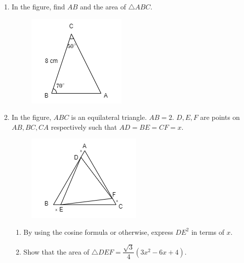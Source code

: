 \documentclass[11pt]{article}
\begin{document}
\begin{enumerate}
    \hrulefill
        
        \hrulefill
            
        \hrulefill
        
        \hrulefill
        
        \hrulefill
            
        \hrulefill
        
        \hrulefill

    \item In the figure, find $AB$ and the area of $\triangle ABC$.\begin{figure}[H]
        \centering
        \includegraphics[scale=0.8]{f4finalq39.png}
    \end{figure}

    
        
        \hrulefill
            
        \hrulefill
        
        \hrulefill
        
        \hrulefill
        
        \hrulefill
        
        \hrulefill
        
        \hrulefill
        
        \hrulefill

    \pagebreak
    \item In the figure, $ABC$ is an equilateral triangle. $AB=2$. $D,E,F$ are points on $AB,BC,CA$ respectively such that $AD=BE=CF=x$.\begin{figure}[H]
        \centering
        \includegraphics[scale=0.8]{f4finalq40.png}
    \end{figure}\begin{enumerate}
        \item By using the cosine formula or otherwise, express $DE^2$ in terms of $x$.
        \item Show that the area of $\triangle DEF=\dfrac{\sqrt{3}}{4}(3x^2-6x+4)$.
    \end{enumerate}
    \hrulefill
            

\end{enumerate}
\end{document}
